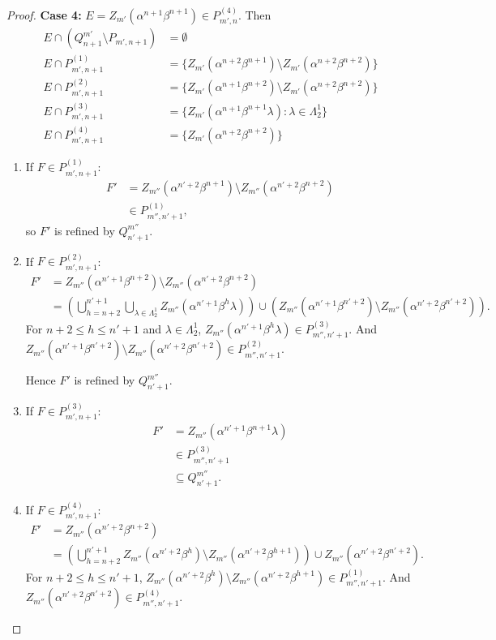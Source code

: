 \documentclass[12pt]{amsart}
\newcommand{\sm}{\setminus}
\newcommand{\sse}{\subseteq}
\newcommand{\emp}{\emptyset}
\newcommand{\al}{\alpha}
\newcommand{\be}{\beta}
\newcommand{\la}{\lambda}
\newcommand{\La}{\Lambda}
\theoremstyle{plain} %
\theoremstyle{definition} %
\begin{document}
\begin{proof}
    \textbf{Case 4:} $E = Z_{m'}(\al^{n+1}\be^{n+1}) \in P_{m',n}^{(4)}$. Then
    \begin{align*}
        E \cap (Q^{m'}_{n+1} \sm P_{m', n+1}) &= \emp\\
        E \cap P^{(1)}_{m',n+1} &= \{Z_{m'}(\al^{n+2}\be^{n+1}) \sm Z_{m'}(\al^{n+2}\be^{n+2})\} \\
        E \cap P^{(2)}_{m',n+1} &= \{ Z_{m'}(\al^{n+1}\be^{n+2}) \sm Z_{m'}(\al^{n+2} \be^{n+2}) \}\\
        E \cap P^{(3)}_{m',n+1} &= \{ Z_{m'}(\al^{n+1}\be^{n+1} \la) : \la \in \La_2^1\} \\
        E \cap P^{(4)}_{m',n+1} &= \{Z_{m'}(\al^{n+2}\be^{n+2})\}
    \end{align*}
    \begin{enumerate}
        \item If $F \in P^{(1)}_{m',n+1}$: \begin{align*}
            F' &= Z_{m''}(\al^{n'+2} \be^{n+1})\sm Z_{m''}(\al^{n'+2} \be^{n+2})\\
            &\in P^{(1)}_{m'', n'+1},
        \end{align*}
        so $F'$ is refined by $Q_{n'+1}^{m''}$.

        \item If $F \in P^{(2)}_{m',n+1}$:
        \begin{align*}
            F' &= Z_{m''}(\al^{n'+1}\be^{n+2}) \sm Z_{m''}(\al^{n'+2} \be^{n+2})\\
            &= \left(\bigcup_{h=n+2}^{n'+1} \bigcup_{\la \in \La_2^1} Z_{m''}(\al^{n'+1} \be^h \la) \right) \cup \left( Z_{m''}(\al^{n'+1} \be^{n'+2}) \sm Z_{m''}(\al^{n'+2} \be^{n'+2})\right).
        \end{align*}
        For $n+2 \le h \le n'+1$ and $\la \in \La_2^1$, $Z_{m''}(\al^{n'+1} \be^h \la) \in P^{(3)}_{m'', n'+1}$. And $Z_{m''}(\al^{n'+1} \be^{n'+2}) \sm Z_{m''}(\al^{n'+2} \be^{n'+2}) \in P^{(2)}_{m'', n'+1}$.

        Hence $F'$ is refined by $Q^{m''}_{n'+1}$.

        \item If $F \in P^{(3)}_{m',n+1}$: \begin{align*}
            F' &= Z_{m''}(\al^{n'+1}\be^{n+1}\la)\\
            &\in P^{(3)}_{m'', n'+1}\\
            &\sse Q_{n'+1}^{m''}.
        \end{align*}

        \item If $F \in P^{(4)}_{m',n+1}$: 
        \begin{align*}
            F' &= Z_{m''}(\al^{n'+2} \be^{n+2} ) \\
            &= \left( \bigcup_{h=n+2}^{n'+1} Z_{m''}(\al^{n'+2} \be^h) \sm Z_{m''}(\al^{n'+2}\be^{h+1}) \right) \cup Z_{m''}(\al^{n'+2} \be^{n'+2}).
        \end{align*}
        For $n+2 \le h \le n'+1$, $Z_{m''}(\al^{n'+2} \be^h) \sm Z_{m''}(\al^{n'+2}\be^{h+1}) \in P^{(1)}_{m'', n'+1}$. And $Z_{m''}(\al^{n'+2} \be^{n'+2}) \in P^{(4)}_{m'', n'+1}$.
        

\end{enumerate}
\end{proof}
\end{document}
